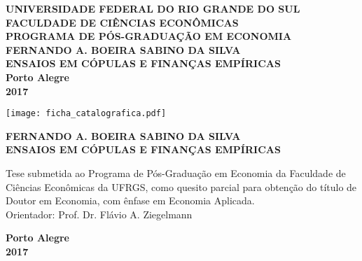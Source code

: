 \documentclass[a4paper,12pt]{report}
\begin{document}
	
	
	\begin{titlepage}
		\setlength{\baselineskip}{24pt}
		\centering
		
		\large \bf{
			UNIVERSIDADE FEDERAL DO RIO GRANDE DO SUL \\
			FACULDADE DE CIÊNCIAS ECONÔMICAS \\
			PROGRAMA DE PÓS-GRADUAÇÃO EM ECONOMIA \\ [3cm]
			
			FERNANDO A. BOEIRA SABINO DA SILVA \\ [3cm]
			
			
			{ENSAIOS EM CÓPULAS E FINANÇAS EMPÍRICAS} \\
			
			\vfill
			Porto Alegre \\
			2017}
		
		
		
		
	\end{titlepage}

\texttt{[image: ficha\_catalografica.pdf]}

	\begin{titlepage}
		\setlength{\baselineskip}{24pt}
		\centering
		\large {
			
			\textbf{FERNANDO A. BOEIRA SABINO DA SILVA} \\ [6cm]
			
			
			\textbf{ENSAIOS EM CÓPULAS E FINANÇAS EMPÍRICAS} \\ [4cm]
			
			
			
			\hfill
			\hspace{.45\textwidth}
			\begin{minipage}{.5\textwidth}
				Tese submetida ao Programa de Pós-Graduação em Economia da Faculdade de Ciências Econômicas da UFRGS, como quesito parcial para obtenção do título de Doutor em Economia, com ênfase em Economia Aplicada.  \\ [1cm]
				Orientador: Prof. Dr. Flávio A. Ziegelmann \\
			\end{minipage}
			
			
			
			\vfill
			\bf{
				Porto Alegre \\
				2017}
		}
	\end{titlepage}
	
\end{document}
